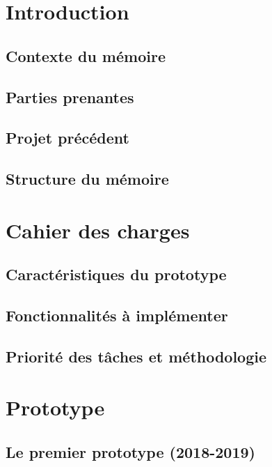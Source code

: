 \chapter{Introduction}

\section{Contexte du mémoire}
\section{Parties prenantes}
\section{Projet précédent}
\section{Structure du mémoire}





\chapter{Cahier des charges}


\section{Caractéristiques du prototype}


\section{Fonctionnalités à implémenter}


\section{Priorité des tâches et méthodologie}


\chapter{Prototype}

\section{Le premier prototype (2018-2019)}
